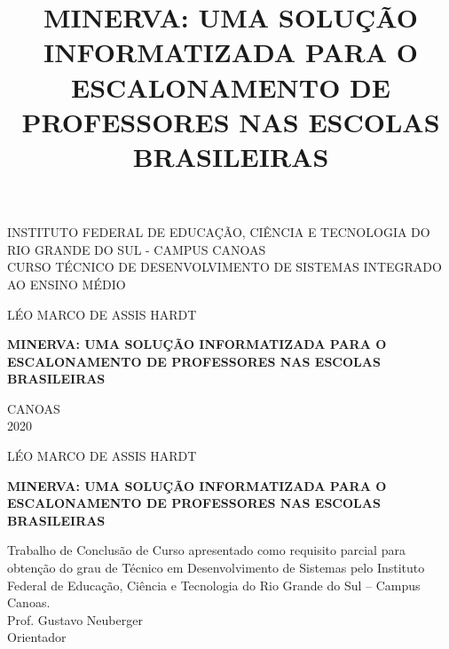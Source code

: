 \documentclass[12pt,a4paper]{article}
\title{MINERVA: UMA SOLUÇÃO INFORMATIZADA PARA O ESCALONAMENTO DE PROFESSORES NAS ESCOLAS BRASILEIRAS}
\newenvironment{bottompar}{\par\vspace*{\fill}}{\clearpage}
\begin{document}
	\thispagestyle{empty}

	\begin{center}
		INSTITUTO FEDERAL DE EDUCAÇÃO, CIÊNCIA E TECNOLOGIA DO RIO GRANDE DO SUL - CAMPUS CANOAS \\
		CURSO TÉCNICO DE DESENVOLVIMENTO DE SISTEMAS INTEGRADO AO ENSINO MÉDIO\\
	\end{center}

	\vskip 3cm

	\begin{center}
		LÉO MARCO DE ASSIS HARDT
	\end{center}

	\vskip 5cm

	\begin{center}
		\textbf{MINERVA: UMA SOLUÇÃO INFORMATIZADA PARA O ESCALONAMENTO DE PROFESSORES NAS ESCOLAS BRASILEIRAS}
	\end{center}


	\begin{bottompar}
		\begin{center}
		CANOAS \\
		2020
		\end{center}
	\end{bottompar}

	\thispagestyle{empty}

	\begin{center}
		LÉO MARCO DE ASSIS HARDT
	\end{center}

	\vskip 3cm


	\begin{center}
		\textbf{MINERVA: UMA SOLUÇÃO INFORMATIZADA PARA O ESCALONAMENTO DE PROFESSORES NAS ESCOLAS BRASILEIRAS}
	\end{center}

	\vskip 2cm

	\begin{addmargin}[7.5cm]{0em}

		\setlength{\parindent}{0mm}
		Trabalho de Conclusão de Curso apresentado como requisito parcial para obtenção do grau de Técnico em Desenvolvimento de Sistemas pelo Instituto Federal de Educação, Ciência e Tecnologia do Rio Grande do Sul – Campus Canoas.\\

		Prof. Gustavo Neuberger\\
		Orientador

	\end{addmargin}
\end{document}
